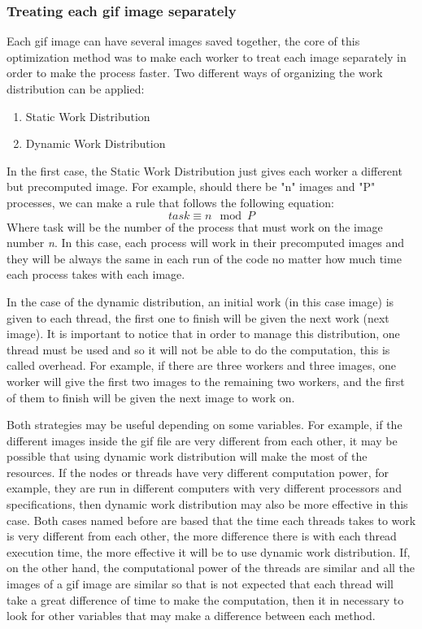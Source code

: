 \documentclass[conference,compsoc]{IEEEtran}
\begin{document}
\subsubsection{Treating each gif image separately} \label{sec:treating-each-image-sep}
Each gif image can have several images saved together, the core of this optimization method was to make each worker to treat each image separately in order to make the process faster.
Two different ways of organizing the work distribution can be applied:
\begin{enumerate}
	\item Static Work Distribution
	\item Dynamic Work Distribution
\end{enumerate}
In the first case, the Static Work Distribution just gives each worker a different but precomputed image. For example, should there be "n" images and "P" processes, we can make a rule that follows the following equation:
\begin{equation}
task \equiv n \mod P
\end{equation} 
Where task will be the number of the process that must work on the image number \textit{n}. In this case, each process will work in their precomputed images and they will be always the same in each run of the code no matter how much time each process takes with each image.

In the case of the dynamic distribution, an initial work (in this case image) is given to each thread, the first one to finish will be given the next work (next image). It is important to notice that in order to manage this distribution, one thread must be used and so it will not be able to do the computation, this is called overhead. For example, if there are three workers and three images, one worker will give the first two images to the remaining two workers, and the first of them to finish will be given the next image to work on.

Both strategies may be useful depending on some variables. For example, if the different images inside the gif file are very different from each other, it may be possible that using dynamic work distribution will make the most of the resources.
If the nodes or threads have very different computation power, for example, they are run in different computers with very different processors and specifications, then dynamic work distribution may also be more effective in this case.
Both cases named before are based that the time each threads takes to work is very different from each other, the more difference there is with each thread execution time, the more effective it will be to use dynamic work distribution. If, on the other hand, the computational power of the threads are similar and all the images of a gif image are similar so that is not expected that each thread will take a great difference of time to make the computation, then it in necessary to look for other variables that may make a difference between each method.
\end{document}
